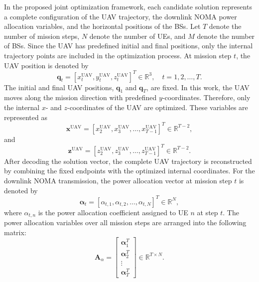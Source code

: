 \documentclass[conference]{IEEEtran}
\begin{document}
In the proposed joint optimization framework, each candidate solution represents a complete configuration of the UAV trajectory, the downlink NOMA power allocation variables, and the horizontal positions of the BSs. Let $T$ denote the number of mission steps, $N$ denote the number of UEs, and $M$ denote the number of BSs. Since the UAV has predefined initial and final positions, only the internal trajectory points are included in the optimization process. At mission step $t$, the UAV position is denoted by 
\begin{equation} 
\mathbf{q}_t = 
\left[ 
x_t^{\mathrm{UAV}}, 
y_t^{\mathrm{UAV}}, 
z_t^{\mathrm{UAV}} 
\right]^T 
\in \mathbb{R}^{3}, 
\quad t = 1,2, \ldots,T. 
\end{equation} 
The initial and final UAV positions, $\mathbf{q}_1$ and $\mathbf{q}_T$, are fixed. In this work, the UAV moves along the mission direction with predefined $y$-coordinates. Therefore, only the internal $x$- and $z$-coordinates of the UAV are optimized. These variables are represented as \begin{equation} \mathbf{x}^{\mathrm{UAV}} = \left[ x_2^{\mathrm{UAV}}, x_3^{\mathrm{UAV}}, \ldots, x_{T-1}^{\mathrm{UAV}} \right]^T \in \mathbb{R}^{T-2}, 
\end{equation} 
and 
\begin{equation} \mathbf{z}^{\mathrm{UAV}} = \left[ z_2^{\mathrm{UAV}}, z_3^{\mathrm{UAV}}, \ldots, z_{T-1}^{\mathrm{UAV}} \right]^T \in \mathbb{R}^{T-2}. 
\end{equation} 
After decoding the solution vector, the complete UAV trajectory is reconstructed by combining the fixed endpoints with the optimized internal coordinates. For the downlink NOMA transmission, the power allocation vector at mission step $t$ is denoted by 
\begin{equation} \boldsymbol{\alpha}_t = \left[ \alpha_{t,1}, \alpha_{t,2}, \ldots, \alpha_{t,N} \right]^T \in \mathbb{R}^{N}, \end{equation} 
where $\alpha_{t,n}$ is the power allocation coefficient assigned to UE $n$ at step $t$. The power allocation variables over all mission steps are arranged into the following matrix: 
\begin{equation} \mathbf{A}_{\alpha} = \left[ \begin{array}{c} \boldsymbol{\alpha}_1^T \\ \boldsymbol{\alpha}_2^T \\ \vdots \\ \boldsymbol{\alpha}_T^T \end{array} \right] \in \mathbb{R}^{T \times N}. \end{equation} 
\end{document}
